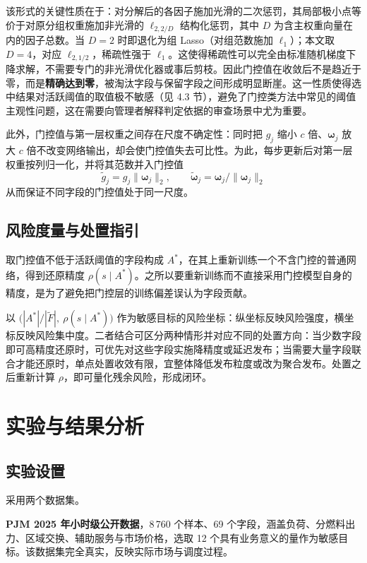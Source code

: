\documentclass[UTF8,zihao=5,twoside]{ctexart}
\begin{document}
该形式的关键性质在于：对分解后的各因子施加光滑的二次惩罚，其局部极小点等价于对原分组权重施加非光滑的 $\ell_{2,2/D}$ 结构化惩罚\cite{ref-dgating}，其中 $D$ 为含主权重向量在内的因子总数。当 $D=2$ 时即退化为组 Lasso（对组范数施加 $\ell_1$）；本文取 $D=4$，对应 $\ell_{2,1/2}$，稀疏性强于 $\ell_1$。这使得稀疏性可以完全由标准随机梯度下降求解，不需要专门的非光滑优化器或事后剪枝。因此门控值在收敛后不是趋近于零，而是\textbf{精确达到零}，被淘汰字段与保留字段之间形成明显断崖。这一性质使得选中结果对活跃阈值的取值极不敏感（见 4.3 节），避免了门控类方法中常见的阈值主观性问题，这在需要向管理者解释判定依据的审查场景中尤为重要。

此外，门控值与第一层权重之间存在尺度不确定性：同时把 $g_j$ 缩小 $c$ 倍、$\bm{\omega}_j$ 放大 $c$ 倍不改变网络输出，却会使门控值失去可比性。为此，每步更新后对第一层权重按列归一化，并将其范数并入门控值
\begin{equation}
\tilde g_j=g_j\|\bm{\omega}_j\|_2,\qquad
\tilde{\bm{\omega}}_j=\bm{\omega}_j/\|\bm{\omega}_j\|_2
\end{equation}
从而保证不同字段的门控值处于同一尺度。

\subsection{风险度量与处置指引}

取门控值不低于活跃阈值的字段构成 $A^{\ast}$，在其上重新训练一个不含门控的普通网络，得到还原精度 $\rho(s\mid A^{\ast})$。之所以要重新训练而不直接采用门控模型自身的精度，是为了避免把门控层的训练偏差误认为字段贡献。

以 $\big(|A^{\ast}|/|\tilde F|,\ \rho(s\mid A^{\ast})\big)$ 作为敏感目标的风险坐标：纵坐标反映风险强度，横坐标反映风险集中度。二者结合可区分两种情形并对应不同的处置方向：当少数字段即可高精度还原时，可优先对这些字段实施降精度或延迟发布；当需要大量字段联合才能还原时，单点处置收效有限，宜整体降低发布粒度或改为聚合发布。处置之后重新计算 $\rho$，即可量化残余风险，形成闭环。

\section{实验与结果分析}

\subsection{实验设置}

采用两个数据集。

\textbf{PJM 2025 年小时级公开数据}\cite{ref-pjm-dataminer}，8\,760 个样本、69 个字段，涵盖负荷、分燃料出力、区域交换、辅助服务与市场价格，选取 12 个具有业务意义的量作为敏感目标。该数据集完全真实，反映实际市场与调度过程。
\end{document}
